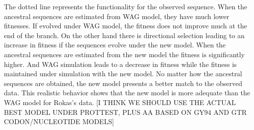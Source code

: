 \documentclass[13pt]{article}
\begin{document}
The dotted line represents the functionality for the observed sequence.
When the ancestral sequences are estimated from WAG model, they have much lower fitnesses. 
If evolved under WAG model, the fitness does not improve much at the end of the branch.
On the other hand there is directional selection leading to an increase in fitness if the sequences evolve under the new model. 
When the ancestral sequences are estimated from the new model the fitness is significantly higher. 
And WAG simulation leads to a decrease in fitness while the fitness is maintained under simulation with the new model.
No matter how the ancestral sequences are obtained, the new model presents a better match to the observed data.
This realistic behavior shows that the new model is more adequate than the WAG model for Rokas's data. [I THINK WE SHOULD USE THE ACTUAL BEST MODEL UNDER PROTTEST, PLUS  AA BASED ON GY94 AND GTR CODON/NUCLEOTIDE MODELS]
\end{document}
